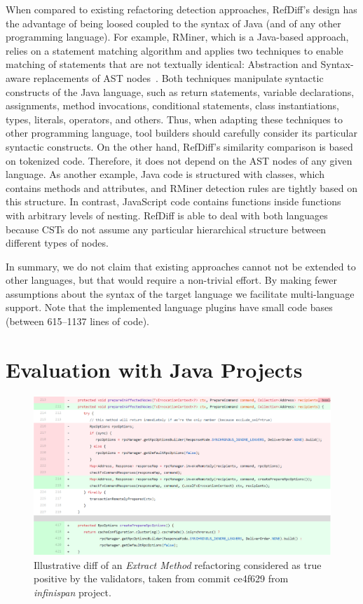 \documentclass[10pt,journal,compsoc]{IEEEtran}
\begin{document}
When compared to existing refactoring detection approaches, RefDiff's design has the advantage of being loosed coupled to the syntax of Java (and of any other programming language).
For example, RMiner, which is a Java-based approach, relies on a statement matching algorithm and applies two techniques to enable matching of statements that are not textually identical: Abstraction and Syntax-aware replacements of AST nodes~\cite{tsantalis2018rminer}.
Both techniques manipulate syntactic constructs of the Java language,
such as return statements, variable declarations, assignments, method invocations, conditional statements, class instantiations, types, literals, operators, and others. Thus, when adapting these techniques to other programming language, tool builders should carefully consider its particular syntactic constructs. On the other hand, RefDiff’s similarity comparison is based on tokenized code. Therefore, it does not depend on the AST nodes of any given language. 
As another example, Java code is structured with classes, which contains methods and attributes, and RMiner detection rules are tightly based on this structure. In contrast, JavaScript code contains functions inside functions with arbitrary levels of nesting. RefDiff is able to deal with both languages because CSTs do not assume any particular hierarchical structure between different types of nodes.

In summary, we do not claim that existing approaches cannot not be extended to other languages, but that would require a non-trivial effort.
By making fewer assumptions about the syntax of the target language we facilitate multi-language support. Note that the implemented language plugins have small code bases (between 615--1137 lines of code).





\section{Evaluation with Java Projects}
\label{sec:eval:java}

\begin{figure}[htpb]
\centering
\includegraphics[width=1.0\textwidth]{img-ex-new-extract-infinispan-ce4f629.png}
\caption{Illustrative diff of an \emph{Extract Method} refactoring considered as true positive by the validators, taken from commit ce4f629 from \emph{infinispan} project.}
\label{FigDiff3}
\end{figure}
\end{document}
